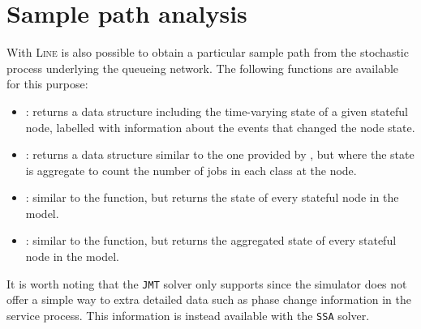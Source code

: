 \section{Sample path analysis}
With \textsc{Line} is also possible to obtain a particular sample path from the stochastic process underlying the queueing network. The following functions are available for this purpose:
\begin{itemize}
\item {}: returns a data structure including the time-varying state of a given stateful node, labelled with information about the events that changed the node state.
\item {}: returns a data structure similar to the one provided by , but where the state is aggregate to count the number of jobs in each class at the node.
\item {}: similar to the  function, but returns the state of every stateful node in the model.
\item {}: similar to the  function, but returns the aggregated state of every stateful node in the model.
\end{itemize}
It is worth noting that the \texttt{JMT} solver only supports  since the simulator does not offer a simple way to extra detailed data such as phase change information in the service process. This information is instead available with the \texttt{SSA} solver.

